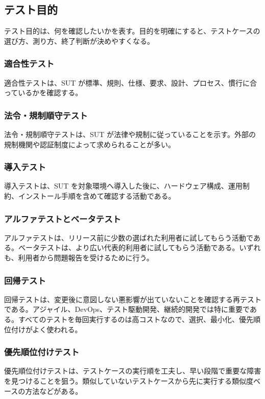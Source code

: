 \documentclass[uplatex,dvipdfmx,a4paper,11pt,nomag]{jsarticle}
\begin{document}
\subsection{テスト目的}
テスト目的は、何を確認したいかを表す。目的を明確にすると、テストケースの選び方、測り方、終了判断が決めやすくなる。

\subsubsection{適合性テスト}
適合性テストは、SUT が標準、規則、仕様、要求、設計、プロセス、慣行に合っているかを確認する。

\subsubsection{法令・規制順守テスト}
法令・規制順守テストは、SUT が法律や規制に従っていることを示す。外部の規制機関や認証制度によって求められることが多い。

\subsubsection{導入テスト}
導入テストは、SUT を対象環境へ導入した後に、ハードウェア構成、運用制約、インストール手順を含めて確認する活動である。

\subsubsection{アルファテストとベータテスト}
アルファテストは、リリース前に少数の選ばれた利用者に試してもらう活動である。ベータテストは、より広い代表的利用者に試してもらう活動である。いずれも、利用者から問題報告を受けるために行う。

\subsubsection{回帰テスト}
回帰テストは、変更後に意図しない悪影響が出ていないことを確認する再テストである。アジャイル、DevOps、テスト駆動開発、継続的開発では特に重要である。すべてのテストを毎回実行するのは高コストなので、選択、最小化、優先順位付けがよく使われる。

\subsubsection{優先順位付けテスト}
優先順位付けテストは、テストケースの実行順を工夫し、早い段階で重要な障害を見つけることを狙う。類似していないテストケースから先に実行する類似度ベースの方法などがある。
\end{document}
